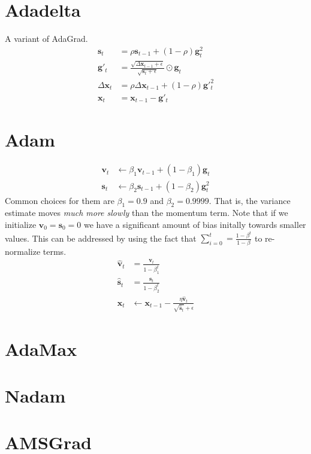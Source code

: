 \section{Adadelta}
A variant of AdaGrad.
\begin{equation}
    \begin{split}
        \mathbf{s}_t &= \rho \mathbf{s}_{t-1} + (1-\rho)\mathbf{g}^2_t \\
        \mathbf{g}'_t &= \frac{\sqrt{\Delta \mathbf{x}_{t-1} + \epsilon}}{\sqrt{\mathbf{s}_t + \epsilon}} \odot \mathbf{g}_t\\
        \Delta \mathbf{x}_t &= \rho \Delta \mathbf{x}_{t-1} + (1 - \rho)\mathbf{g}'^2_t\\
        \mathbf{x}_t &= \mathbf{x}_{t-1} - \mathbf{g}'_t
    \end{split}
\end{equation}

\section{Adam}
\begin{equation}
    \begin{split}
        \mathbf{v}_t &\leftarrow \beta_1 \mathbf{v}_{t-1} + (1-\beta_1)\mathbf{g}_t \\
        \mathbf{s}_t &\leftarrow \beta_2 \mathbf{s}_{t-1} + (1-\beta_2)\mathbf{g}^2_t
    \end{split}
\end{equation}
Common choices for them are $\beta_1 = 0.9$ and $\beta_2 = 0.9999$. That is, the variance estimate moves \textit{much more slowly}
than the momentum term. Note that if we initialize $\mathbf{v}_0 = \mathbf{s}_0 = 0$ we have a significant amount of bias initally
towards smaller values. This can be addressed by using the fact that $\sum_{i=0}^t = \frac{1-\beta^t}{1-\beta}$ to re-normalize terms.
\begin{equation}
    \begin{split}
        \mathbf{\hat v}_t &= \frac{\mathbf{v}_t}{1-\beta_1^t} \\
        \mathbf{\hat s}_t &= \frac{\mathbf{s}_t}{1-\beta_2^t} \\
        \mathbf{x}_t &\leftarrow \mathbf{x}_{t-1} - \frac{\eta \mathbf{\hat v}_t}{\sqrt{\mathbf{\hat s}_t} + \epsilon}
    \end{split}
\end{equation}

\section{AdaMax}
\section{Nadam}
\section{AMSGrad}